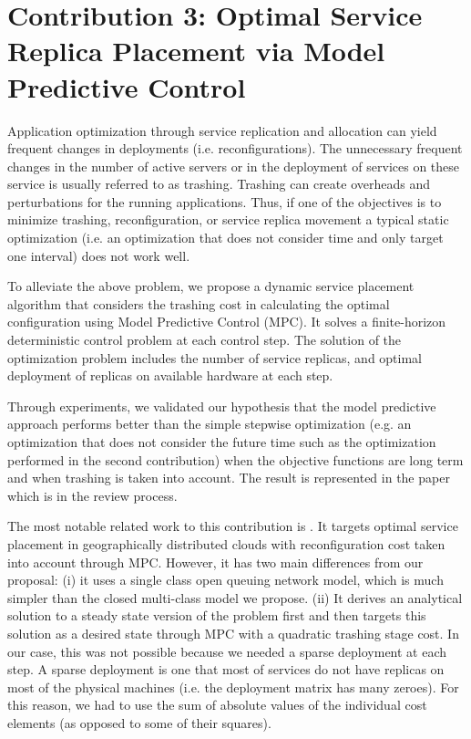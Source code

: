 \documentclass[11pt]{article}
\begin{document}
\section{Contribution 3: Optimal Service Replica Placement via Model Predictive Control} 
Application optimization through service replication and allocation can yield frequent changes in deployments (i.e. reconfigurations). 
The unnecessary frequent changes in the number of active servers or in the deployment of services on these service is usually referred to as trashing. 
Trashing can create overheads and perturbations for the running applications. 
Thus, if one of the objectives is to minimize trashing, reconfiguration, or service replica movement a typical static optimization (i.e. an optimization that does not consider time and only target one interval) does not work well. 

    To alleviate the above problem, we propose a dynamic service placement algorithm that considers the trashing cost in calculating the optimal configuration using Model Predictive Control (MPC). It solves a finite-horizon deterministic control problem at each control step. The solution of the optimization problem includes the number of service replicas, and optimal deployment of replicas on available hardware at each step. 

   Through experiments, we validated our hypothesis that the model predictive approach performs better than the simple stepwise optimization (e.g. an optimization that does not consider the future time such as the optimization performed in the second contribution) when the objective functions are long term and when trashing is taken into account. The result is represented in the paper \cite{ghanbari2014mpc} which is in the review process. 
  
		The most notable related work to this contribution is \cite{zhang2012dynamicPlacement}. It targets optimal service placement in geographically distributed clouds with reconfiguration cost taken into account through MPC. However, it has two main differences from our proposal: (i) it uses a single class open queuing network model, which is much simpler than the closed multi-class model we propose. (ii) It derives an analytical solution to a steady state version of the problem first and then targets this solution as a desired state through MPC with a quadratic trashing stage cost. In our case, this was not possible because we needed a sparse deployment at each step. A sparse deployment is one that most of services do not have replicas on most of the physical machines (i.e. the deployment matrix has many zeroes). For this reason, we had to use the sum of absolute values of the individual cost elements (as opposed to some of their squares). 
		
\end{document}
